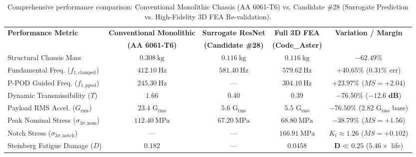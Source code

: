 \begin{table}[htbp]
\centering
\caption{Comprehensive performance comparison: Conventional Monolithic Chassis (AA 6061-T6) vs. Candidate \#28 (Surrogate Prediction vs. High-Fidelity 3D FEA Re-validation).}
\label{tab:candidate28_comparison}
\begin{adjustbox}{width=\textwidth}
\begin{tabular}{lcccc}
\toprule
\textbf{Performance Metric} & \textbf{Conventional Monolithic} & \textbf{Surrogate ResNet} & \textbf{Full 3D FEA} & \textbf{Variation / Margin} \\
& \textbf{(AA 6061-T6)} & \textbf{(Candidate \#28)} & \textbf{(Code\_Aster)} & \\
\midrule
Structural Chassis Mass & $\SI{0.308}{\kilo\gram}$ & $\SI{0.116}{\kilo\gram}$ & $\SI{0.116}{\kilo\gram}$ & $\mathbf{-62.49\%}$ \\
Fundamental Freq. ($f_{1,\text{clamped}}$) & $\SI{412.10}{\hertz}$ & $\SI{581.40}{\hertz}$ & $\SI{579.62}{\hertz}$ & $\mathbf{+40.65\%}$ ($0.31\%$ err) \\
P-POD Guided Freq. ($f_{1,\text{ppod}}$) & $\SI{245.30}{\hertz}$ & --- & $\SI{304.10}{\hertz}$ & $+23.97\%$ ($MS = +2.04$) \\
Dynamic Transmissibility ($T$) & $1.66$ & $0.40$ & $0.39$ & $\mathbf{-76.50\%}$ ($\mathbf{-12.6\text{ dB}}$) \\
Payload RMS Accel. ($G_{\text{rms}}$) & $23.4\text{ G}_{\text{rms}}$ & $5.6\text{ G}_{\text{rms}}$ & $5.5\text{ G}_{\text{rms}}$ & $-76.50\%$ ($2.82\text{ G}_{\text{rms}}$ base) \\
Peak Nominal Stress ($\sigma_{3\sigma,\text{nom}}$) & $\SI{112.40}{\mega\pascal}$ & $\SI{67.20}{\mega\pascal}$ & $\SI{68.80}{\mega\pascal}$ & $-38.79\%$ ($MS = +1.56$) \\
Notch Stress ($\sigma_{3\sigma,\text{notch}}$) & --- & --- & $\SI{166.91}{\mega\pascal}$ & $K_t \approx 1.26$ ($MS = +0.102$) \\
Steinberg Fatigue Damage ($D$) & $0.182$ & --- & $0.0458$ & $\mathbf{D \ll 0.25}$ ($5.46\times$ life) \\
\bottomrule
\end{tabular}
\end{adjustbox}
\end{table}

